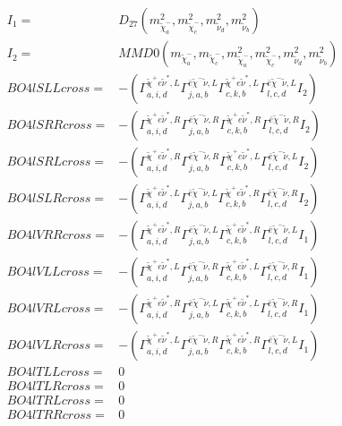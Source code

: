 \documentclass[A4,landscape]{article}
\begin{document}
\begin{align} 
I_1 = & D_{27}(m^2_{\tilde{\chi}^-_{{a}}}, m^2_{\tilde{\chi}^-_{{c}}}, m^2_{\tilde{\nu}_{{d}}}, m^2_{\tilde{\nu}_{{b}}}) \\ 
I_2 = & MMD0(m_{\tilde{\chi}^-_{{a}}}, m_{\tilde{\chi}^-_{{c}}}, m^2_{\tilde{\chi}^-_{{a}}}, m^2_{\tilde{\chi}^-_{{c}}}, m^2_{\tilde{\nu}_{{d}}}, m^2_{\tilde{\nu}_{{b}}}) \\ 
  BO4lSLLcross= & -( \Gamma^{\tilde{\chi}^+e \tilde{\nu}^*,L}_{a, i, d} \Gamma^{\bar{e}\tilde{\chi}^- \tilde{\nu} ,L}_{j, a, b} \Gamma^{\tilde{\chi}^+e \tilde{\nu}^*,L}_{c, k, b} \Gamma^{\bar{e}\tilde{\chi}^- \tilde{\nu} ,L}_{l, c, d} I_2) \\ 
  BO4lSRRcross= & -( \Gamma^{\tilde{\chi}^+e \tilde{\nu}^*,R}_{a, i, d} \Gamma^{\bar{e}\tilde{\chi}^- \tilde{\nu} ,R}_{j, a, b} \Gamma^{\tilde{\chi}^+e \tilde{\nu}^*,R}_{c, k, b} \Gamma^{\bar{e}\tilde{\chi}^- \tilde{\nu} ,R}_{l, c, d} I_2) \\ 
  BO4lSRLcross= & -( \Gamma^{\tilde{\chi}^+e \tilde{\nu}^*,R}_{a, i, d} \Gamma^{\bar{e}\tilde{\chi}^- \tilde{\nu} ,R}_{j, a, b} \Gamma^{\tilde{\chi}^+e \tilde{\nu}^*,L}_{c, k, b} \Gamma^{\bar{e}\tilde{\chi}^- \tilde{\nu} ,L}_{l, c, d} I_2) \\ 
  BO4lSLRcross= & -( \Gamma^{\tilde{\chi}^+e \tilde{\nu}^*,L}_{a, i, d} \Gamma^{\bar{e}\tilde{\chi}^- \tilde{\nu} ,L}_{j, a, b} \Gamma^{\tilde{\chi}^+e \tilde{\nu}^*,R}_{c, k, b} \Gamma^{\bar{e}\tilde{\chi}^- \tilde{\nu} ,R}_{l, c, d} I_2) \\ 
  BO4lVRRcross= & -( \Gamma^{\tilde{\chi}^+e \tilde{\nu}^*,R}_{a, i, d} \Gamma^{\bar{e}\tilde{\chi}^- \tilde{\nu} ,L}_{j, a, b} \Gamma^{\tilde{\chi}^+e \tilde{\nu}^*,R}_{c, k, b} \Gamma^{\bar{e}\tilde{\chi}^- \tilde{\nu} ,L}_{l, c, d} I_1) \\ 
  BO4lVLLcross= & -( \Gamma^{\tilde{\chi}^+e \tilde{\nu}^*,L}_{a, i, d} \Gamma^{\bar{e}\tilde{\chi}^- \tilde{\nu} ,R}_{j, a, b} \Gamma^{\tilde{\chi}^+e \tilde{\nu}^*,L}_{c, k, b} \Gamma^{\bar{e}\tilde{\chi}^- \tilde{\nu} ,R}_{l, c, d} I_1) \\ 
  BO4lVRLcross= & -( \Gamma^{\tilde{\chi}^+e \tilde{\nu}^*,R}_{a, i, d} \Gamma^{\bar{e}\tilde{\chi}^- \tilde{\nu} ,L}_{j, a, b} \Gamma^{\tilde{\chi}^+e \tilde{\nu}^*,L}_{c, k, b} \Gamma^{\bar{e}\tilde{\chi}^- \tilde{\nu} ,R}_{l, c, d} I_1) \\ 
  BO4lVLRcross= & -( \Gamma^{\tilde{\chi}^+e \tilde{\nu}^*,L}_{a, i, d} \Gamma^{\bar{e}\tilde{\chi}^- \tilde{\nu} ,R}_{j, a, b} \Gamma^{\tilde{\chi}^+e \tilde{\nu}^*,R}_{c, k, b} \Gamma^{\bar{e}\tilde{\chi}^- \tilde{\nu} ,L}_{l, c, d} I_1) \\ 
  BO4lTLLcross= & 0 \\ 
  BO4lTLRcross= & 0 \\ 
  BO4lTRLcross= & 0 \\ 
  BO4lTRRcross= & 0 \\ 
\end{align} 
\end{document}
